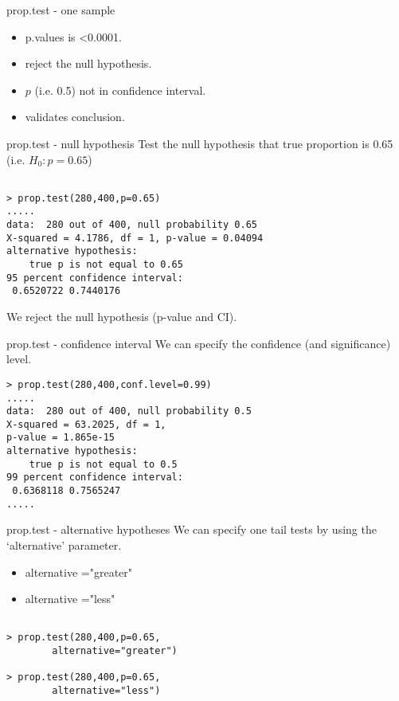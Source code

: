 \documentclass[pdf,default,slideColor,colorBG]{prosper}
\begin{document}
\begin{slide}{prop.test - one sample}
\begin{itemize}
\item p.values is <0.0001. 
\item reject the null hypothesis.
\item $p$ (i.e. 0.5) not in confidence interval.
\item validates conclusion.
\end{itemize}


\end{slide}


\begin{slide}{prop.test - null hypothesis}
Test the null hypothesis that true proportion is 0.65 (i.e. $H_{0}: p = 0.65$)
\begin{verbatim}

> prop.test(280,400,p=0.65)
.....
data:  280 out of 400, null probability 0.65
X-squared = 4.1786, df = 1, p-value = 0.04094
alternative hypothesis: 
    true p is not equal to 0.65
95 percent confidence interval:
 0.6520722 0.7440176

\end{verbatim}
We reject the null hypothesis (p-value and CI).

\end{slide}

\begin{slide}{prop.test - confidence interval}
We can specify the confidence (and significance) level.
\begin{verbatim}
> prop.test(280,400,conf.level=0.99)
.....
data:  280 out of 400, null probability 0.5
X-squared = 63.2025, df = 1, 
p-value = 1.865e-15
alternative hypothesis:
    true p is not equal to 0.5
99 percent confidence interval:
 0.6368118 0.7565247
.....
\end{verbatim}

\end{slide}
\begin{slide}{prop.test - alternative hypotheses}
We can specify one tail tests by using the `alternative' parameter.
\begin{itemize}
\item alternative ="greater" 
\item alternative ="less"
\end{itemize}
\begin{verbatim}

> prop.test(280,400,p=0.65,
        alternative="greater")
        
> prop.test(280,400,p=0.65,
        alternative="less")
\end{verbatim}
\end{slide}
\end{document}
